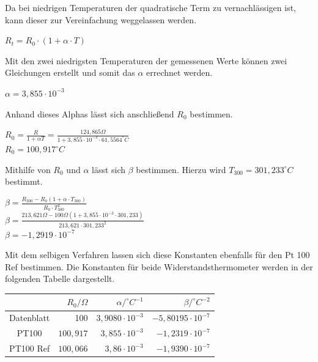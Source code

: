 \documentclass[a4paper,11pt,oneside]{article}
\begin{document}
Da bei niedrigen Temperaturen der quadratische Term zu vernachlässigen ist, kann dieser zur Vereinfachung weggelassen werden.

\begin{center}
$R_t = R_0 \cdot (1 + \alpha \cdot T)$
\end{center}
 
Mit den zwei niedrigsten Temperaturen der gemessenen Werte können zwei Gleichungen erstellt und somit das $\alpha$ errechnet werden. 

\begin{center}
$\alpha = 3,855 \cdot 10^{-3}$
\end{center}

Anhand dieses Alphas lässt sich anschließend $R_0$ bestimmen.

\begin{center}
$R_0 = \frac{R}{1 + \alpha T} = \frac{124,865\Omega}{1 + 3,855 \cdot 10^{-3} \cdot 61,5564^\circ C}$\\
\vspace{0.5cm}
$R_0 = 100,917^\circ C$
\end{center}

Mithilfe von $R_0$ und $\alpha$ lässt sich $\beta$ bestimmen. Hierzu wird $T_{300} = 301,233^\circ C$ bestimmt.
\begin{center}
$\beta = \frac{R_{300} - R_0(1+\alpha \cdot T_{300})}{R_0 \cdot T_{300}^2}$\\
\vspace{0.5cm}
$\beta = \frac{213,621 \Omega - 100\Omega (1+ 3,855\cdot 10^{-3} \cdot 301,233)}{213,621 \cdot 301,233^2}$\\
\vspace{0.5cm}
$\beta = -1,2919 \cdot 10^{-7}$
\end{center}

Mit dem selbigen Verfahren lassen sich diese Konstanten ebenfalls für den Pt 100 Ref bestimmen. Die Konstanten für beide Widerstandsthermometer werden in der folgenden Tabelle dargestellt.\\
\begin{center}
\begin{tabular}{|c|r|r|r|}
\hline 
 & $R_0 / \Omega$ & $\alpha/^\circ C^{-1}$ & $\beta / ^\circ C ^{-2}$ \\ 
\hline 
Datenblatt & 100 & $3,9080 \cdot 10 ^{-3}$ & $-5,80195 \cdot 10^{-7}$ \\ 
\hline 
PT100 & $100,917$ & $3,855 \cdot 10^{-3}$ & $-1,2319 \cdot 10^{-7}$ \\ 
\hline 
PT100 Ref & $100,066$ & $3,86 \cdot 10^{-3}$ & $-1,9390 \cdot 10^{-7}$ \\ 
\hline 
\end{tabular} 
\end{center}
\end{document}

